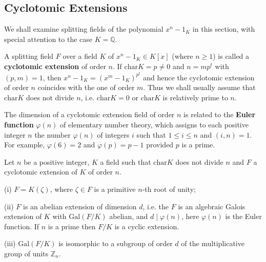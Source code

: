 \subsection{Cyclotomic Extensions}
We shall examine splitting fields of the polynomial $x^n-1_K$ in this section, with special attention to the case $K=\mathbb{Q}$.\par
A splitting field $F$ over a field $K$ of $x^n-1_K\in K[x]$ (where $n\ge 1$) is called a \textbf{cyclotomic extension} of order $n$. If $\mathrm{char}K=p\ne 0$ and $n=mp^t$ with $(p,m)=1$, then $x^n-1_K=(x^m-1_K)^{p^t}$ and hence the cyclotomic extension of order $n$ coincides with the one of order $m$. Thus we shall usually assume that $\mathrm{char}K$ does not divide $n$, i.e. $\mathrm{char}K=0$ or $\mathrm{char}K$ is relatively prime to $n$.\par
The dimension of a cyclotomic extension field of order $n$ is related to the \textbf{Euler function} $\varphi(n)$ of elementary number theory, which assigns to each positive integer $n$ the number $\varphi(n)$ of integers $i$ such that $1\le i\le n$ and $(i,n)=1$. For example, $\varphi(6)=2$ and $\varphi(p)=p-1$ provided $p$ is a prime.
\begin{theorem}
Let $n$ be a positive integer, $K$ a field such that $\mathrm{char}K$ does not divide $n$ and $F$ a cyclotomic extension of $K$ of order $n$.\par
(i) $F=K(\zeta)$, where $\zeta\in F$ is a primitive $n$-th root of unity;\par
(ii) $F$ is an abelian extension of dimension $d$, i.e. the $F$ is an algebraic Galois extension of $K$ with $\mathrm{Gal}(F/K)$ abelian, and $d\mid \varphi(n)$, here $\varphi(n)$ is the Euler function. If $n$ is a prime then $F/K$ is a cyclic extension.\par
(iii) $\mathrm{Gal}(F/K)$ is isomorphic to a subgroup of order $d$ of the multiplicative group of units $\mathbb{Z}_n$.
\end{theorem}
